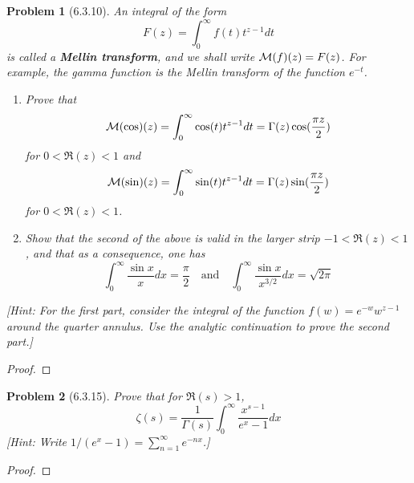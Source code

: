 \documentclass[10pt]{article}
\newcommand{\sk}{\vskip 10mm}
\theoremstyle{plain}
\newtheorem{problem}{Problem}
\theoremstyle{remark}
\begin{document}
\begin{problem}[6.3.10]
  An integral of the form
  \[
    F(z)=\int_0^\infty f(t)t^{z-1}dt
  \]
  is called a \textbf{Mellin transform}, and we shall write
  ${\cal M}(f)(z)=F(z)$. For example, the gamma function is the Mellin
  transform of the function $e^{-t}$.
  \begin{enumerate}
  \item[(a)] Prove that
    \[
      {\cal M}(\cos)(z)=\int_0^\infty\cos(t)t^{z-1}dt=\Gamma(z)\cos(\frac{\pi z}{2})
    \]
    for $0<\Re(z)<1$ and
    \[
      {\cal M}(\sin)(z)=\int_0^\infty\sin(t)t^{z-1}dt=\Gamma(z)\sin(\frac{\pi z}{2})
    \]
    for $0<\Re(z)<1$.
  \item[(b)] Show that the second of the above is valid in the larger strip
    $-1<\Re(z)<1$, and that as a consequence, one has
    \[
      \int_0^\infty \frac{\sin x}{x}dx=\frac{\pi}{2}\quad \text{and}\quad \int_0^\infty\frac{\sin x}{x^{3/2}}dx=\sqrt{2\pi}
    \]
  \end{enumerate}
  [Hint: For the first part, consider the integral of the function
  $f(w)=e^{-w}w^{z-1}$ around the quarter annulus. Use the analytic continuation
  to prove the second part.]
\end{problem}

\begin{proof}
  
\end{proof}

\sk

\begin{problem}[6.3.15]
  Prove that for $\Re(s)>1$,
  \[
    \zeta(s)=\frac{1}{\Gamma(s)}\int_0^\infty\frac{x^{s-1}}{e^x-1}dx
  \]
  [Hint: Write $1/(e^x-1)=\sum_{n=1}^\infty e^{-nx}$.]
\end{problem}

\begin{proof}
  
\end{proof}

\end{document}
